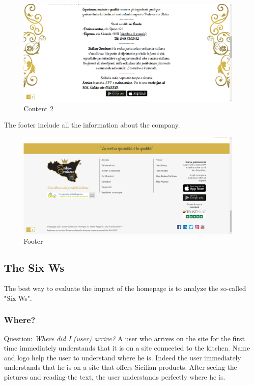\begin{figure}[H]
	\centering\includegraphics[width=12cm]{Img/content2.png}
	\caption{Content 2}
\end{figure}

The footer include all the information about the company.

\begin{figure}[H]
	\centering\includegraphics[width=12cm]{Img/contacts.png}
	\caption{Footer}
\end{figure}


\subsection{The Six Ws}
The best way to evaluate the impact of the homepage is to analyze the so-called "Six Ws".

\subsubsection{Where?}

Question: \textit{Where did I (user) arrive?}
\newline
A user who arrives on the site for the first time immediately understands that it is on a site connected to the kitchen. Name and logo help the user to understand where he is. Indeed the user immediately understands that he is on a site that offers Sicilian products. After seeing the pictures and reading the text, the user understands perfectly where he is.

